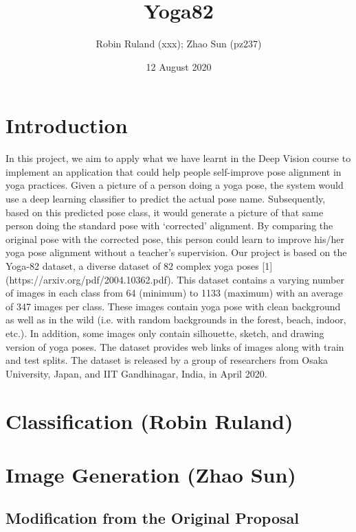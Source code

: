 \documentclass{article}
\title{Yoga82}
\author{Robin Ruland (xxx); Zhao Sun (pz237) }
\date{12 August 2020}
\begin{document}
\maketitle

\section{Introduction}

In this project, we aim to apply what we have learnt in the Deep Vision course to implement an application that could help people self-improve pose alignment in yoga practices. Given a picture of a person doing a yoga pose, the system would use a deep learning classifier to predict the actual pose name. Subsequently, based on this predicted pose class, it would generate a picture of that same person doing the standard pose with ‘corrected’ alignment. By comparing the original pose with the corrected pose, this person could learn to improve his/her yoga pose alignment without a teacher’s supervision.
\newline
\newline
Our project is based on the Yoga-82 dataset, a diverse dataset of 82 complex yoga poses [1] (https://arxiv.org/pdf/2004.10362.pdf). This dataset contains a varying number of images in each class from 64 (minimum) to 1133 (maximum) with an average of 347 images per class. These images contain yoga pose with clean background as well as in the wild (i.e. with random backgrounds in the forest, beach, indoor, etc.). In addition, some images only contain silhouette, sketch, and drawing version of yoga poses. The dataset provides web links of images along with train and test splits. The dataset is released by a group of researchers from Osaka University, Japan, and IIT Gandhinagar, India, in April 2020.


\section{Classification (Robin Ruland)}




\section{Image Generation (Zhao Sun)}

\subsection{Modification from the Original Proposal}
\end{document}
